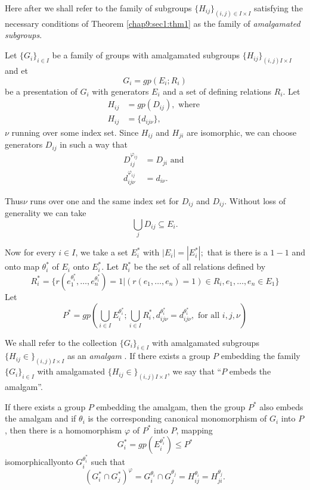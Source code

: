 Here after we shall refer to the family of subgroups $\big\{ H_{ij}
\big\}_{(i, j) \in I \times I}$ satisfying the necessary
conditions of Theorem \ref{chap9:sec1:thm1} as the family of \textit{
  amalgamated subgroups}. 

Let $\big\{ G_{i} \big\}_{i \in I}$ be a family of groups with
amalgamated subgroups \break $\big\{ H_{ij} \big\}_{(i, j)  I \times I}$ and
et  
$$
G_i = gp (E_i ; R_i)
$$
be a presentation of $G_i$ with generators $E_i$ and a set of defining
relations $R_i$. Let  
\begin{align*}
  H_{ij} & = gp(D_{ij}), \text{ where }\\
  H_{ij} & = \big\{ d_{i j \nu} \big\},
\end{align*} 
$\nu$ running over some index set. Since $H_{ij}$ and $H_{ji}$ are
isomorphic, we can choose generators $D_{ij}$ in such a way that  
\begin{align*}
  D^{\varphi_{ij}}_{ij}& = D_{ji} \text{ and }\\
  d^{\varphi_{ij}}_{ij \nu}& = d_{i \nu}.
\end{align*}

Thus\pageoriginale $\nu$ runs over one and the same index set for $D_{ij}$ and
$D_{ij}$. Without loss of generality we can take  
$$
\bigcup_j D_{ij} \subseteq E_i.
$$

Now for every $i \in I$, we take a set $E^*_i$ with
$|E_i|=|E^*_i|;$ that is there is a $1-1$ and onto map $\theta^*_i$ of
$E_i$ onto $E^*_i$. Let $R^*_i$ be the set of all relations defined by 
$$
R^*_i = \Bigg\{ r \left(e^{\theta^*_i}_1, \ldots,  e^{\theta^*_i}_n\right) =1 \Big|
(r(e_1, \ldots,  e_n) = 1) \in R_i,  e_1, \ldots, e_n
\in E_1 \Bigg\} 
$$
Let 
$$
P^* = gp\left(\bigcup_{i \in I} E_i^{\theta^*_i}; \bigcup_{i
  \in I} R^*_i,  d^{\theta^*_i}_{i j \nu}= d^{\theta^*_i}_{i j
  \nu}, \text{ for all } i,j,  \nu \right) 
$$ 

We shall refer to the  collection $\big\{ G_{i} \big\}_{i \in
  I}$ with amalgamated subgroups $\big\{ H_{ij} \in \big\}_{(i, j)  I
  \times I}$ as an \textit{ amalgam }. If there exists a group $P$
embedding the family $\big\{ G_{i} \big\}_{i \in I}$ with
amalgamated $\big\{ H_{ij} \in \big\}_{(i, j)  I \times I}$, we say that
``$P$ embeds the amalgam''.

\begin{theorem}\label{chap9:sec1:thm2}%
  If there exists a group $P$ embedding the amalgam, then the group
  $P^*$ also embeds the amalgam and if $\theta_i$ is the corresponding
  canonical monomorphism of $G_i$ into $P$, then there is a
  homomorphism $\varphi$ of $P^*$ into $P$, mapping  
  $$
  G^*_i = gp(E^{\theta^*_i}_i ) \leq P^*
  $$
  isomorphically\pageoriginale onto $G^{\theta^*_i}_i$ such that 
  $$
  (G^*_i \cap G^*_j)^{\varphi} = G_i^{{\theta_i}} \cap
  G^{\theta_j}_j = H^{\theta_i}_{ij} = H^{\theta_j}_{ji}. 
  $$ 
\end{theorem}

